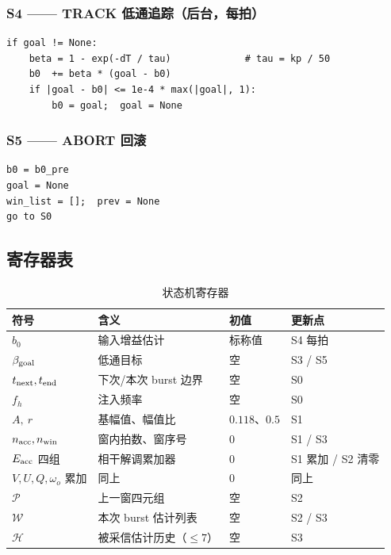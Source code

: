 \documentclass[11pt,a4paper]{ctexart}
\begin{document}
\subsubsection*{S4 —— TRACK 低通追踪（后台，每拍）}

\begin{verbatim}
if goal != None:
    beta = 1 - exp(-dT / tau)             # tau = kp / 50
    b0  += beta * (goal - b0)
    if |goal - b0| <= 1e-4 * max(|goal|, 1):
        b0 = goal;  goal = None
\end{verbatim}

\subsubsection*{S5 —— ABORT 回滚}

\begin{verbatim}
b0 = b0_pre
goal = None
win_list = [];  prev = None
go to S0
\end{verbatim}

\subsection{寄存器表}

\begin{table}[H]
\centering
\caption{状态机寄存器}
\begin{tabular}{llll}
\toprule
符号 & 含义 & 初值 & 更新点\\
\midrule
$b_0$ & 输入增益估计 & 标称值 & S4 每拍\\
$\beta_{\rm goal}$ & 低通目标 & 空 & S3 / S5\\
$t_{\rm next},t_{\rm end}$ & 下次/本次 burst 边界 & 空 & S0\\
$f_h$ & 注入频率 & 空 & S0\\
$A,\ r$ & 基幅值、幅值比 & $0.118$、$0.5$ & S1\\
$n_{\rm acc},n_{\rm win}$ & 窗内拍数、窗序号 & $0$ & S1 / S3\\
$E_{\rm acc}$ 四组 & 相干解调累加器 & $0$ & S1 累加 / S2 清零\\
$V,U,Q,\omega_o$ 累加 & 同上 & $0$ & 同上\\
$\mathcal{P}$ & 上一窗四元组 & 空 & S2\\
$\mathcal{W}$ & 本次 burst 估计列表 & 空 & S2 / S3\\
$\mathcal{H}$ & 被采信估计历史（$\le7$） & 空 & S3\\
\bottomrule
\end{tabular}
\end{table}
\end{document}
